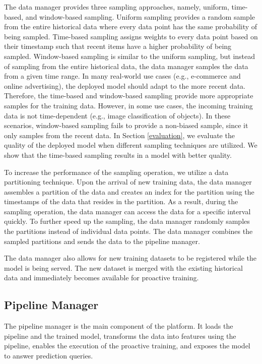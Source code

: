 The data manager provides three sampling approaches, namely, uniform, time-based, and window-based sampling.
Uniform sampling provides a random sample from the entire historical data where every data point has the same probability of being sampled.
Time-based sampling assigns weights to every data point based on their timestamp such that recent items have a higher probability of being sampled.
Window-based sampling is similar to the uniform sampling, but instead of sampling from the entire historical data, the data manager samples the data from a given time range. 
In many real-world use cases (e.g., e-commerce and online advertising), the deployed model should adapt to the more recent data.
Therefore, the time-based and window-based sampling provide more appropriate samples for the training data.
However, in some use cases, the incoming training data is not time-dependent (e.g., image classification of objects).
In these scenarios, window-based sampling fails to provide a non-biased sample, since it only samples from the recent data.
In Section \ref{evaluation}, we evaluate the quality of the deployed model when different sampling techniques are utilized.
We show that the time-based sampling results in a model with better quality.

To increase the performance of the sampling operation, we utilize a data partitioning technique.
Upon the arrival of new training data, the data manager assembles a partition of the data and creates an index for the partition using the timestamps of the data that resides in the partition.
As a result, during the sampling operation, the data manager can access the data for a specific interval quickly.
To further speed up the sampling, the data manager randomly samples the partitions instead of individual data points.
The data manager combines the sampled partitions and sends the data to the pipeline manager.

The data manager also allows for new training datasets to be registered while the model is being served.
The new dataset is merged with the existing historical data and immediately becomes available for proactive training.

\subsection{Pipeline Manager} \label{pipeline-manager} 
The pipeline manager is the main component of the platform.
It loads the pipeline and the trained model, transforms the data into features using the pipeline, enables the execution of the proactive training, and exposes the model to answer prediction queries.

